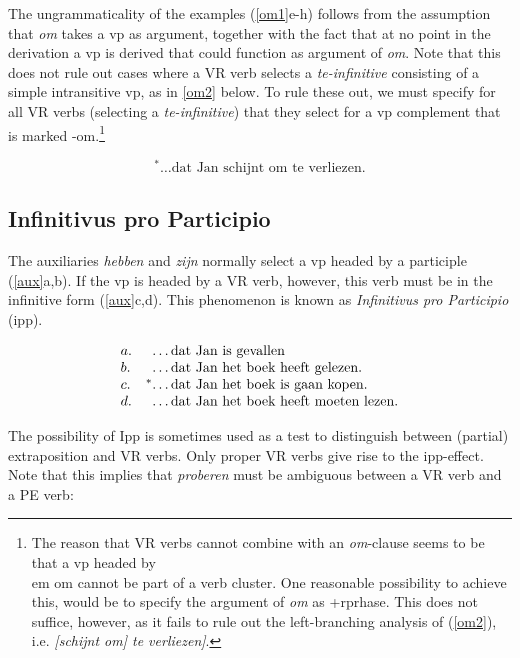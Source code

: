 The ungrammaticality of the examples (\ref{om1}e-h) follows from the assumption
that {\em om} takes a {\sc vp} as argument, together with the fact that at no
point in the derivation a {\sc vp} is derived that could function as argument of
{\em om}.  Note that this does not rule out cases where a VR
verb selects a {\em te-infinitive} consisting of a simple intransitive {\sc vp}, 
as in \ref{om2} below.  To rule these out, we must specify for all VR verbs 
(selecting a {\em te-infinitive}) that they select for a {\sc vp} complement that is 
marked {\sc -om}.\footnote{
The reason that VR verbs cannot combine with an {\em om}-clause seems to be that 
a {\sc vp} headed by {\\em om} cannot be part of a verb cluster. One reasonable 
possibility to achieve this, would be to specify the argument of {\em om} as 
{\sc +rprhase}. This does not suffice, however, as it fails to rule out the 
left-branching analysis of (\ref{om2}), i.e. {\em [schijnt om] te verliezen]}.}

\begin{equation}
\label{om2}
^* \ldots\mbox{dat Jan  schijnt om te verliezen.} 
\end{equation}


\subsection{Infinitivus pro Participio}

The auxiliaries {\em hebben} and {\em zijn} normally select a {\sc vp}
headed by a participle (\ref{aux}a,b). If the {\sc vp} is headed by a VR
verb, however, this verb must be in the infinitive form (\ref{aux}c,d). This
phenomenon is known as  {\em Infinitivus pro Participio} ({\sc ipp}). 

\begin{equation}
\label{aux}
\begin{array}[t]{ll@{\hspace{0cm}}l}
a. && \ldots\mbox{dat Jan  is gevallen} \\
b. && \ldots\mbox{dat Jan het boek heeft gelezen.} \\
c. &^*& \ldots\mbox{dat Jan het boek is gaan kopen.} \\
d. && \ldots\mbox{dat Jan het boek heeft moeten lezen.} \\
\end{array}
\end{equation} 

The possibility of {\sc Ipp} is sometimes used as a test to distinguish between
(partial) extraposition and VR verbs.  Only proper VR verbs give rise to the
{\sc ipp}-effect.  Note that this implies that {\em proberen} must be ambiguous
between a VR verb and a PE verb:

